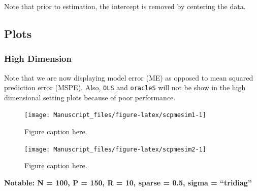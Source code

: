 \documentclass[11pt,]{report}
\begin{document}
Note that prior to estimation, the intercept is removed by centering the data.

\hypertarget{plots-1}{%
\subsection{Plots}\label{plots-1}}

\hypertarget{high-dimension}{%
\subsubsection{High Dimension}\label{high-dimension}}

Note that we are now displaying model error (ME) as opposed to mean squared prediction error (MSPE). Also, \texttt{OLS} and \texttt{oracleS} will not be show in the high dimensional setting plots because of poor performance.

\begin{figure}

{\centering \texttt{[image: Manuscript\_files/figure-latex/scpmesim1-1]} 

}

\caption{Figure caption here.}\label{fig:scpmesim1}
\end{figure}

\vspace{1cm}

\begin{figure}

{\centering \texttt{[image: Manuscript\_files/figure-latex/scpmesim2-1]} 

}

\caption{Figure caption here.}\label{fig:scpmesim2}
\end{figure}

\vspace{1cm}

\textbf{Notable: N = 100, P = 150, R = 10, sparse = 0.5, sigma = ``tridiag''}
\end{document}
